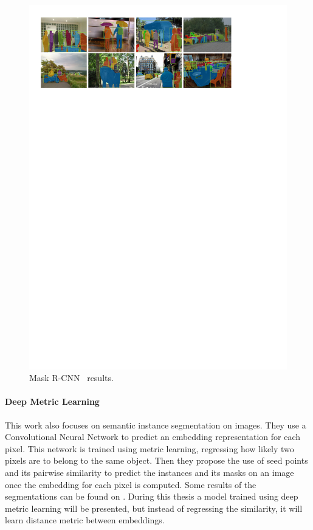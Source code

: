 \begin{figure}[h]
  \centering
  \includegraphics[width=1.\linewidth]{figures/maskrcnn/results.pdf}
  \caption{Mask R-CNN~\maskrcnn{} results. }
  \label{fig:stateofart:maskrcnn}
\end{figure}

\paragraph{Deep Metric Learning~\deepml{}}
This work also focuses on semantic instance segmentation on images.
They use a Convolutional Neural Network to predict an embedding representation for each pixel.
This network is trained using metric learning, regressing how likely two pixels are to belong to the same object.
Then they propose the use of seed points and its pairwise similarity to predict the instances and its masks on an image once the embedding for each pixel is computed.
Some results of the segmentations can be found on .
During this thesis a model trained using deep metric learning will be presented, but instead of regressing the similarity, it will learn distance metric between embeddings.

